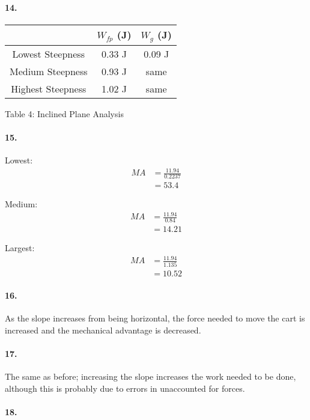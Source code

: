     \paragraph*{14.}

    \begin{center}
        \begin{tabular}{|c|c|c|}
            \hline
                & $W_{fp}$ (J) & $W_{g}$ (J)    \\
            \hline
            Lowest Steepness & 0.33 J & 0.09 J  \\
            \hline
            Medium Steepness & 0.93 J & same    \\
            \hline
            Highest Steepness & 1.02 J & same   \\
            \hline
        \end{tabular}

        Table 4: Inclined Plane Analysis
    \end{center}

    \paragraph*{15.}

    Lowest:
    \begin{align*}
        MA  & = \frac{11.94}{0.2237}    \\
            & = \boxed{53.4}
    \end{align*}

    Medium:
    \begin{align*}
        MA  & = \frac{11.94}{0.84}      \\
            & = \boxed{14.21}
    \end{align*}

    Largest:
    \begin{align*}
        MA  & = \frac{11.94}{1.135}     \\
            & = \boxed{10.52}
    \end{align*}

    \paragraph*{16.}
    As the slope increases from being horizontal, the force needed to move the cart is increased and the mechanical advantage is decreased.

    \paragraph*{17.}
    The same as before; increasing the slope increases the work needed to be done, although this is probably due to errors in unaccounted for forces.

    \paragraph*{18.}



